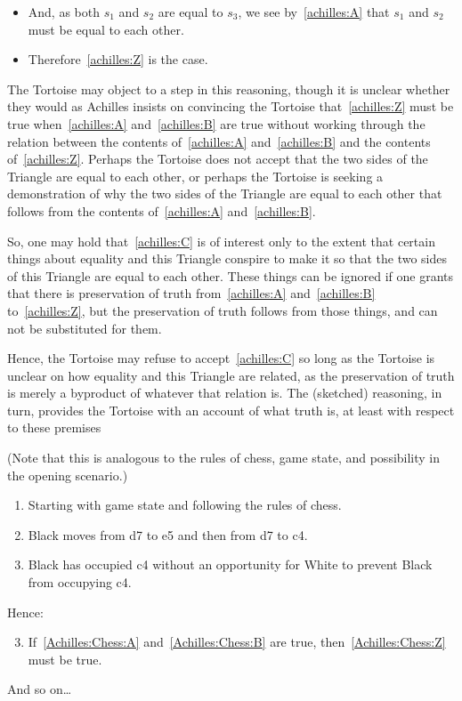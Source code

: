 \documentclass[10pt]{article}
\begin{document}
\begin{note}
{\begin{itemize}
  \item And, as both \(s_{1}\) and \(s_{2}\) are equal to \(s_{3}\), we see by~\ref{achilles:A} that \(s_{1}\) and \(s_{2}\) must be equal to each other.
  \item Therefore~\ref{achilles:Z} is the case.
  \end{itemize}
  The Tortoise may object to a step in this reasoning, though it is unclear whether they would as Achilles insists on convincing the Tortoise that~\ref{achilles:Z} must be true when~\ref{achilles:A} and~\ref{achilles:B} are true without working through the relation between the contents of~\ref{achilles:A} and~\ref{achilles:B} and the contents of~\ref{achilles:Z}.
  Perhaps the Tortoise does not accept that the two sides of the Triangle are equal to each other, or perhaps the Tortoise is seeking a demonstration of why the two sides of the Triangle are equal to each other that follows from the contents of~\ref{achilles:A} and~\ref{achilles:B}.

  So, one may hold that~\ref{achilles:C} is of interest only to the extent that certain things about equality and this Triangle conspire to make it so that the two sides of this Triangle are equal to each other.
  These things can be ignored if one grants that there is preservation of truth from~\ref{achilles:A} and~\ref{achilles:B} to~\ref{achilles:Z}, but the preservation of truth follows from those things, and can not be substituted for them.

  Hence, the Tortoise may refuse to accept~\ref{achilles:C} so long as the Tortoise is unclear on how equality and this Triangle are related, as the preservation of truth is merely a byproduct of whatever that relation is.
  The (sketched) reasoning, in turn, provides the Tortoise with an account of what truth is, at least with respect to these premises

  (Note that this is analogous to the rules of chess, game state, and possibility in the opening scenario.)
    {
    \color{red}
    \begin{enumerate}[label=(\emph{\Alph*\('\)}), ref=\emph{\Alph*\('\)}]
    \item\label{Achilles:Chess:A} Starting with game state and following the rules of chess.
    \item\label{Achilles:Chess:B} Black moves from d7 to e5 and then from d7 to c4.
      \setcounter{enumi}{25}
    \item\label{Achilles:Chess:Z} Black has occupied c4 without an opportunity for White to prevent Black from occupying c4.
    \end{enumerate}
    Hence:
    \begin{enumerate}[label=(\emph{\Alph*\('\)}), ref=\emph{\Alph*\('\)}]
      \setcounter{enumi}{2}
      \item\label{Achilles:Chess:C} If~\ref{Achilles:Chess:A} and~\ref{Achilles:Chess:B} are true, then~\ref{Achilles:Chess:Z} must be true.
    \end{enumerate}
    And so on\dots
  }
}


\end{note}
\end{document}
